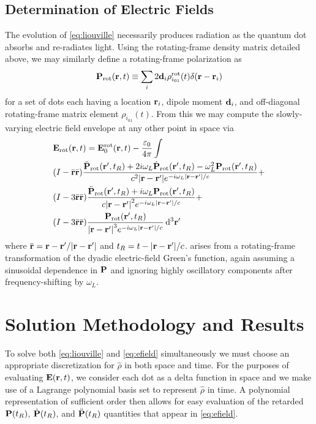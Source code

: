 \documentclass[conference]{IEEEtran}
\begin{document}
\subsection{Determination of Electric Fields}
The evolution of \cref{eq:liouville} necessarily produces radiation as the quantum dot absorbs and re-radiates light.
Using the rotating-frame density matrix detailed above, we may similarly define a rotating-frame polarization as
\begin{equation}
  \vb{P}_\text{rot}(\vb{r}, t) \equiv \sum_i 2\vb{d}_i \rho_{i_{01}}^\text{rot}(t) \delta(\vb{r} - \vb{r}_i)
  \label{eq:polarization}
\end{equation}
for a set of dots each having a location $\vb{r}_i$, dipole moment $\vb{d}_i$, and off-diagonal rotating-frame matrix element $\rho_{i_{01}}(t)$.
From this we may compute the slowly-varying electric field envelope at any other point in space via
\begin{equation}
  \begin{aligned}
    & \vb{E}_\text{rot}(\vb{r}, t) = \vb{E}_0^\text{rot}(\vb{r}, t) - \frac{\varepsilon_0}{4\pi} \int \\
    & \qty(I - \bar{\vb{r}}\bar{\vb{r}}) \frac{\ddot{\vb{P}}_\text{rot}(\vb{r}', t_R) + 2 i \omega_L \dot{\vb{P}}_\text{rot}(\vb{r}', t_R) - \omega_L^2 \vb{P}_\text{rot}(\vb{r}', t_R)}{c^2 \abs{\vb{r} - \vb{r}'} e^{-i \omega_L \abs{\vb{r} - \vb{r}'}/c}} + \\
    & \qty(I - 3\bar{\vb{r}}\bar{\vb{r}}) \frac{\ddot{\vb{P}}_\text{rot}(\vb{r}', t_R) + i \omega_L \vb{P}_\text{rot}(\vb{r}', t_R)}{c \abs{\vb{r} - \vb{r}'}^2 e^{-i \omega_L \abs{\vb{r} - \vb{r}'}/c}} + \\
    & \qty(I - 3\bar{\vb{r}}\bar{\vb{r}}) \frac{\vb{P}_\text{rot}(\vb{r}', t_R)}{\abs{\vb{r} - \vb{r}'}^3 e^{-i \omega_L \abs{\vb{r} - \vb{r}'}/c}} \dd[3]{\vb{r}'}
  \label{eq:efield}
  \end{aligned}
\end{equation}
where $\bar{\vb{r}} = \vb{r} - \vb{r}'/\abs{\vb{r} - \vb{r}'}$ and $t_R = t - \abs{\vb{r} - \vb{r}'}/c$.
 arises from a rotating-frame transformation of the dyadic electric-field Green's function, again assuming a sinusoidal dependence in $\vb{P}$ and ignoring highly oscillatory components after frequency-shifting by $\omega_L$.

\section{Solution Methodology and Results}
To solve both \cref{eq:liouville} and \cref{eq:efield} simultaneously we must choose an appropriate discretization for $\hat{\rho}$ in both space and time.
For the purposes of evaluating $\vb{E}(\vb{r},t)$, we consider each dot as a delta function in space and we make use of a Lagrange polynomial basis set to represent $\hat{\rho}$ in time.
A polynomial representation of sufficient order then allows for easy evaluation of the retarded $\vb{P}(t_R)$, $\dot{\vb{P}}(t_R)$, and $\ddot{\vb{P}}(t_R)$ quantities that appear in \cref{eq:efield}.
\end{document}
